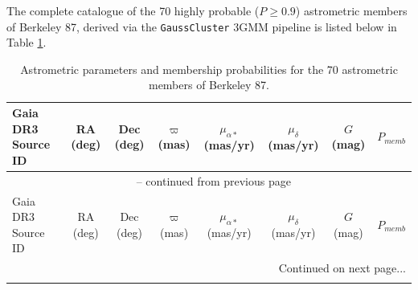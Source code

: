 The complete catalogue of the 70 highly probable ($P \ge 0.9$) astrometric members of Berkeley 87, derived via the \texttt{GaussCluster} 3GMM pipeline is listed below in Table \ref{tab:be87_members}.

\begin{longtable}{lccccccc}
    \caption{Astrometric parameters and membership probabilities for the 70 astrometric members of Berkeley 87.}
    \label{tab:be87_members} \\
    
    \hline\hline
    Gaia DR3 Source ID & RA (deg) & Dec (deg) & $\varpi$ (mas) & $\mu_{\alpha*}$ (mas/yr) & $\mu_{\delta}$ (mas/yr) & $G$ (mag) & $P_{memb}$ \\
    \hline
    \endfirsthead
    
    \multicolumn{8}{c}{{\tablename\ \thetable{} -- continued from previous page}} \\
    \hline\hline
    Gaia DR3 Source ID & RA (deg) & Dec (deg) & $\varpi$ (mas) & $\mu_{\alpha*}$ (mas/yr) & $\mu_{\delta}$ (mas/yr) & $G$ (mag) & $P_{memb}$ \\
    \hline
    \endhead
    
    \hline \multicolumn{8}{r}{{Continued on next page...}} \\
    \endfoot
    
    \hline\hline
    \endlastfoot


\end{longtable}
